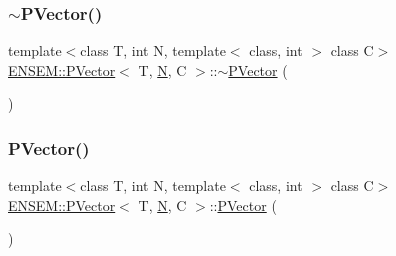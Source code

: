 \mbox{\label{classENSEM_1_1PVector_a74ba2f55760e8ed1947ef3bb534400b6}} 
\subsubsection{\texorpdfstring{$\sim$PVector()}{~PVector()}\hspace{0.1cm}{\footnotesize\ttfamily [1/3]}}
{\footnotesize\ttfamily template$<$class T, int N, template$<$ class, int $>$ class C$>$ \\
\mbox{\hyperlink{classENSEM_1_1PVector}{E\+N\+S\+E\+M\+::\+P\+Vector}}$<$ T, \mbox{\hyperlink{adat__devel_2lib_2hadron_2operator__name__util_8cc_a7722c8ecbb62d99aee7ce68b1752f337}{N}}, C $>$\+::$\sim$\mbox{\hyperlink{classENSEM_1_1PVector}{P\+Vector}} (\begin{DoxyParamCaption}{ }\end{DoxyParamCaption})\hspace{0.3cm}{\ttfamily [inline]}}

\mbox{\label{classENSEM_1_1PVector_afc5f971e6ec88789c8205b2e03b1edfd}} 
\subsubsection{\texorpdfstring{PVector()}{PVector()}\hspace{0.1cm}{\footnotesize\ttfamily [2/3]}}
{\footnotesize\ttfamily template$<$class T, int N, template$<$ class, int $>$ class C$>$ \\
\mbox{\hyperlink{classENSEM_1_1PVector}{E\+N\+S\+E\+M\+::\+P\+Vector}}$<$ T, \mbox{\hyperlink{adat__devel_2lib_2hadron_2operator__name__util_8cc_a7722c8ecbb62d99aee7ce68b1752f337}{N}}, C $>$\+::\mbox{\hyperlink{classENSEM_1_1PVector}{P\+Vector}} (\begin{DoxyParamCaption}{ }\end{DoxyParamCaption})\hspace{0.3cm}{\ttfamily [inline]}}

\mbox{\label{classENSEM_1_1PVector_a74ba2f55760e8ed1947ef3bb534400b6}} 
